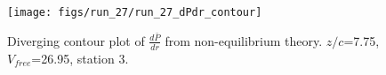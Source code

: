 \begin{figure}[H]
\centering
\texttt{[image: figs/run\_27/run\_27\_dPdr\_contour]}
\caption{Diverging contour plot of $\frac{d\bar{P}}{dr}$ from non-equilibrium theory. $z/c$=7.75, $V_{free}$=26.95, station 3.}
\label{fig:run_27_dPdr_contour}
\end{figure}


